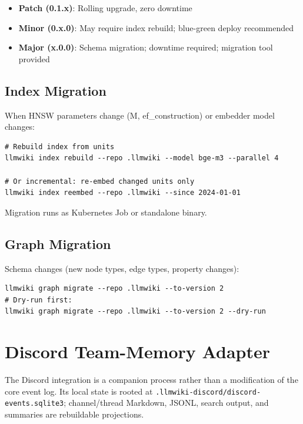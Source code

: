 \begin{itemize}
  \item \textbf{Patch (0.1.x)}: Rolling upgrade, zero downtime
  \item \textbf{Minor (0.x.0)}: May require index rebuild; blue-green deploy recommended
  \item \textbf{Major (x.0.0)}: Schema migration; downtime required; migration tool provided
\end{itemize}

\subsection{Index Migration}
\label{sec:deploy:index-migration}

When HNSW parameters change (M, ef\_construction) or embedder model changes:

\begin{verbatim}
# Rebuild index from units
llmwiki index rebuild --repo .llmwiki --model bge-m3 --parallel 4

# Or incremental: re-embed changed units only
llmwiki index reembed --repo .llmwiki --since 2024-01-01
\end{verbatim}

Migration runs as Kubernetes Job or standalone binary.

\subsection{Graph Migration}
\label{sec:deploy:graph-migration}

Schema changes (new node types, edge types, property changes):

\begin{verbatim}
llmwiki graph migrate --repo .llmwiki --to-version 2
# Dry-run first:
llmwiki graph migrate --repo .llmwiki --to-version 2 --dry-run
\end{verbatim}

\section{Discord Team-Memory Adapter}
\label{sec:deploy:discord}

The Discord integration is a companion process rather than a modification of
the core event log. Its local state is rooted at
\texttt{.llmwiki-discord/discord-events.sqlite3}; channel/thread Markdown,
JSONL, search output, and summaries are rebuildable projections.

